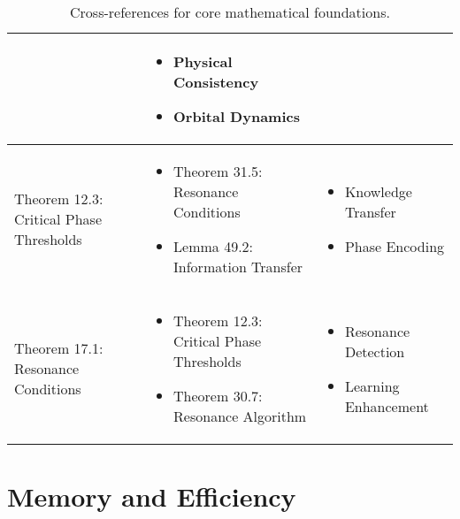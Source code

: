 \begin{table}[h]
\begin{tabular}{|l|p{7cm}|p{4cm}|}
\begin{itemize}
\end{itemize} &
\begin{itemize}
    \item Physical Consistency
    \item Orbital Dynamics
\end{itemize} \\
\hline
Theorem 12.3: Critical Phase Thresholds &
\begin{itemize}
    \item Theorem 31.5: Resonance Conditions
    \item Lemma 49.2: Information Transfer
\end{itemize} &
\begin{itemize}
    \item Knowledge Transfer
    \item Phase Encoding
\end{itemize} \\
\hline
Theorem 17.1: Resonance Conditions &
\begin{itemize}
    \item Theorem 12.3: Critical Phase Thresholds
    \item Theorem 30.7: Resonance Algorithm
\end{itemize} &
\begin{itemize}
    \item Resonance Detection
    \item Learning Enhancement
\end{itemize} \\
\hline
\end{tabular}
\caption{Cross-references for core mathematical foundations.}
\label{tab:xref_core}
\end{table}

\section{Memory and Efficiency}

